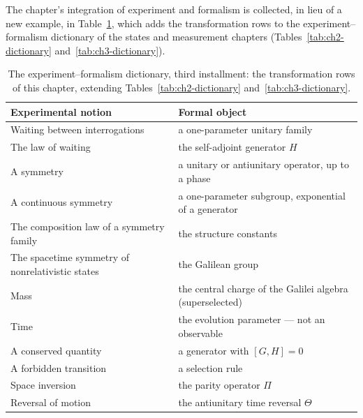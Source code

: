 The chapter's integration of experiment and formalism is collected, in lieu of a new example, in Table~\ref{tab:ch4-dictionary}, which adds the transformation rows to the experiment--formalism dictionary of the states and measurement chapters (Tables~\ref{tab:ch2-dictionary} and~\ref{tab:ch3-dictionary}).
\begin{table}[htbp!]
    \centering
    \caption{The experiment--formalism dictionary, third installment: the transformation rows of this chapter, extending Tables~\ref{tab:ch2-dictionary} and~\ref{tab:ch3-dictionary}.}
    \label{tab:ch4-dictionary}
    \small
    \setlength{\tabcolsep}{4pt}
    \begin{tabular}{ll}
        \toprule
        Experimental notion & Formal object \\
        \midrule
        Waiting between interrogations & a one-parameter unitary family \\
        The law of waiting & the self-adjoint generator $H$ \\
        A symmetry & a unitary or antiunitary operator, up to a phase \\
        A continuous symmetry & a one-parameter subgroup, exponential of a generator \\
        The composition law of a symmetry family & the structure constants \\
        The spacetime symmetry of nonrelativistic states & the Galilean group \\
        Mass & the central charge of the Galilei algebra (superselected) \\
        Time & the evolution parameter --- not an observable \\
        A conserved quantity & a generator with $[G,H] = 0$ \\
        A forbidden transition & a selection rule \\
        Space inversion & the parity operator $\Pi$ \\
        Reversal of motion & the antiunitary time reversal $\Theta$ \\
        \bottomrule
    \end{tabular}
\end{table}

